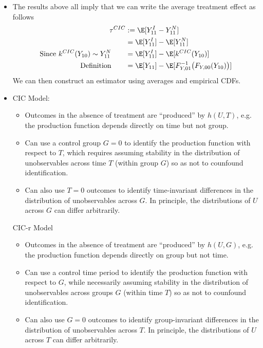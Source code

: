 \documentclass[12pt]{article}
\theoremstyle{plain}
\theoremstyle{definition}
\theoremstyle{remark}
\begin{document}
\begin{itemize}
\begin{itemize}
    \end{itemize}


  \item
    The results above all imply that we can write the average treatment
    effect as follows
    \begin{align*}
      \tau^{CIC}
      &:=
      \E[Y_{11}^I - Y_{11}^N]
      \\
      &=
      \E[Y_{11}^I] - \E[Y_{11}^N]
      \\
      \text{Since $k^{CIC}(Y_{10})\sim Y^N_{11}$}
      \qquad
      &=
      \E[Y_{11}^I] - \E[k^{CIC}(Y_{10})]
      \\
      \text{Definition}
      \qquad
      &=
      \E[Y_{11}]
      - \E[
          F_{Y,01}^{-1}\big(
            F_{Y,00}(Y_{10})
          \big)
        ]
    \end{align*}
    We can then construct an estimator using averages and empirical
    CDFs.


  \item
    CIC Model:
    \begin{itemize}
      \item Outcomes in the absence of treatment are ``produced'' by
        $h(U,T)$, e.g.  the production function depends directly on time
        but not group.
      \item Can use a control group $G=0$ to identify the production
        function with respect to $T$, which requires assuming stability
        in the distribution of unobservables across time $T$ (within
        group $G$) so as not to counfound identification.
      \item Can also use $T=0$ outcomes to identify time-invariant
        differences in the distribution of unobservables across $G$.
        In principle, the distributions of $U$ across $G$ can differ
        arbitrarily.
    \end{itemize}
    CIC-r Model
    \begin{itemize}
      \item Outcomes in the absence of treatment are ``produced'' by
        $h(U,G)$, e.g.  the production function depends directly on
        group but not time.
      \item Can use a control time period to identify the production
        function with respect to $G$, while necessarily assuming
        stability in the distribution of unobservables across groups $G$
        (within time $T$) so as not to counfound identification.
      \item Can also use $G=0$ outcomes to identify group-invariant
        differences in the distribution of unobservables across $T$.
        In principle, the distributions of $U$ across $T$ can differ
        arbitrarily.
    \end{itemize}

\end{itemize}
\end{document}
